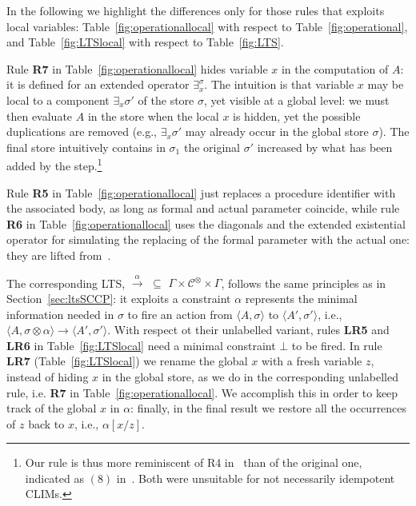 \documentclass[main.tex]{subfiles}
\begin{document}
In the following we highlight the differences only for those rules that exploits local variables: Table~\ref{fig:operationallocal} with respect to Table~\ref{fig:operational}, and Table~\ref{fig:LTSlocal} with respect to Table~\ref{fig:LTS}.



Rule {\bf R7} in Table~\ref{fig:operationallocal} hides variable $x$ in the computation of $A$: it is defined for an extended operator $\exists_x^\sigma$.
The intuition is that variable $x$ may be local to a component $\exists_x \sigma'$ of the store $\sigma$, yet visible at a global level: we must then evaluate $A$ in the store
when the local $x$ is hidden, yet the possible duplications are removed (e.g., $\exists_x \sigma'$ may already occur in the global store $\sigma$). The final store intuitively contains in $\sigma_1$ the original $\sigma'$ increased by what has been added by the
step.\footnote{Our rule is thus more reminiscent of R4 in~\cite[Table~1]{pippo} than of the original one, indicated as $(8)$ in~\cite[p.~342]{popl91}. Both were unsuitable for not necessarily idempotent CLIMs.}

Rule {\bf R5} in Table~\ref{fig:operationallocal} just replaces a procedure identifier with the associated body, as long as formal and actual parameter coincide, while rule {\bf R6} in Table~\ref{fig:operationallocal} uses the diagonals and the extended existential operator for simulating the replacing  of the formal parameter with the actual one: they are lifted from~\cite[Table~I]{deBoer97}.

The corresponding  LTS,   $\xrightarrow{\;  \alpha \;} \, \, \subseteq \, \,\Gamma \times \mathcal{C}^\otimes \times \Gamma$, follows the same principles as in Section~\ref{sec:ltsSCCP}:  it exploits a constraint $\alpha$  represents the minimal information needed in $\sigma$ to fire an action from $\langle A, \sigma\rangle$  to $\langle A', \sigma' \rangle$, i.e., $\langle A, \sigma \otimes \alpha\rangle \longrightarrow \langle A' , \sigma' \rangle$.
With respect ot their unlabelled variant, rules {\bf LR5} and {\bf LR6} in Table~\ref{fig:LTSlocal} need a minimal constraint $\bot$ to be fired.
In rule {\bf LR7} (Table~\ref{fig:LTSlocal}) we rename the global $x$ with a fresh variable $z$, instead of hiding $x$ in the global store, as we do in the corresponding unlabelled rule, i.e. {\bf R7} in Table~\ref{fig:operationallocal}. We accomplish this in order to keep track of the global $x$ in $\alpha$: finally, in the final result we restore all the occurrences of $z$ back to $x$, i.e., $\alpha[x/z]$.
\end{document}

